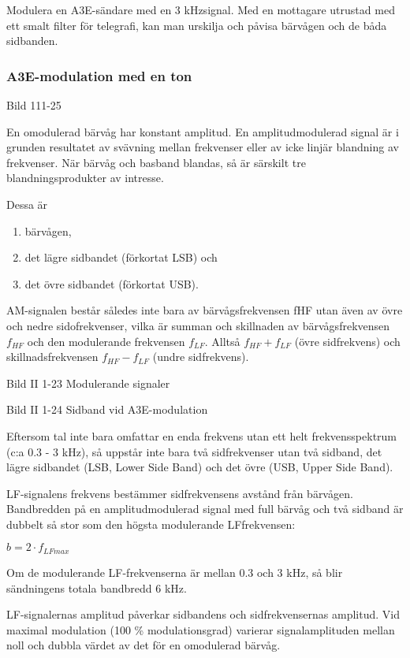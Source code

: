 \documentclass[a4paper,twoside,twocolumn,openright]{book}
\begin{document}
Modulera en A3E-sändare med en 3 kHzsignal. Med en mottagare utrustad med ett
smalt filter för telegrafi, kan man urskilja och påvisa bärvågen och de båda sidbanden.

\subsubsection{A3E-modulation med en ton}

Bild 111-25

En omodulerad bärvåg har konstant amplitud. En amplitudmodulerad signal är i grunden
resultatet av svävning mellan frekvenser eller av icke linjär blandning av frekvenser. När 
bärvåg och basband blandas, så är särskilt tre blandningsprodukter av intresse.

Dessa är

\begin{enumerate}[label=-,noitemsep]
\item bärvågen,
\item det lägre sidbandet (förkortat LSB) och
\item det övre sidbandet (förkortat USB).
\end{enumerate}

AM-signalen består således inte bara av bärvågsfrekvensen fHF utan även av övre
och nedre sidofrekvenser, vilka är summan och skillnaden av bärvågsfrekvensen $f_{HF}$ och
den modulerande frekvensen $f_{LF}$. Alltså $f_{HF} + f_{LF}$ (övre sidfrekvens) och
skillnadsfrekvensen $f_{HF} - f_{LF}$ (undre sidfrekvens).

Bild II 1-23 Modulerande signaler

Bild II 1-24 Sidband vid A3E-modulation

Eftersom tal inte bara omfattar en enda frekvens utan ett helt frekvensspektrum (c:a
0.3 - 3 kHz), så uppstår inte bara två sidfrekvenser utan två sidband, det lägre sidbandet
(LSB, Lower Side Band) och det övre (USB, Upper Side Band).

LF-signalens frekvens bestämmer sidfrekvensens avstånd från bärvågen. Bandbredden på en
amplitudmodulerad signal med full bärvåg och två sidband är dubbelt så stor som den högsta
modulerande LFfrekvensen:

$b= 2 \cdot f_{LFmax}$

Om de modulerande LF-frekvenserna är mellan 0.3 och 3 kHz, så blir sändningens
totala bandbredd 6 kHz.

LF-signalernas amplitud påverkar sidbandens och sidfrekvensernas amplitud. Vid
maximal modulation (100 \% modulationsgrad) varierar signalamplituden mellan noll
och dubbla värdet av det för en omodulerad bärvåg.
\end{document}
